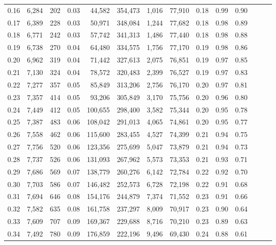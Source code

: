 \begin{tabular}{rrrrrrrrrrrrrr}
0.16 &  6,284 &    202 &  0.03 &   44,582 &  354,473 &   1,016 &  77,910 &  0.18 &  0.99 &      0.90 \\
0.17 &  6,389 &    228 &  0.03 &   50,971 &  348,084 &   1,244 &  77,682 &  0.18 &  0.98 &      0.89 \\
0.18 &  6,771 &    242 &  0.03 &   57,742 &  341,313 &   1,486 &  77,440 &  0.18 &  0.98 &      0.88 \\
0.19 &  6,738 &    270 &  0.04 &   64,480 &  334,575 &   1,756 &  77,170 &  0.19 &  0.98 &      0.86 \\
0.20 &  6,962 &    319 &  0.04 &   71,442 &  327,613 &   2,075 &  76,851 &  0.19 &  0.97 &      0.85 \\
0.21 &  7,130 &    324 &  0.04 &   78,572 &  320,483 &   2,399 &  76,527 &  0.19 &  0.97 &      0.83 \\
0.22 &  7,277 &    357 &  0.05 &   85,849 &  313,206 &   2,756 &  76,170 &  0.20 &  0.97 &      0.81 \\
0.23 &  7,357 &    414 &  0.05 &   93,206 &  305,849 &   3,170 &  75,756 &  0.20 &  0.96 &      0.80 \\
0.24 &  7,449 &    412 &  0.05 &  100,655 &  298,400 &   3,582 &  75,344 &  0.20 &  0.95 &      0.78 \\
0.25 &  7,387 &    483 &  0.06 &  108,042 &  291,013 &   4,065 &  74,861 &  0.20 &  0.95 &      0.77 \\
0.26 &  7,558 &    462 &  0.06 &  115,600 &  283,455 &   4,527 &  74,399 &  0.21 &  0.94 &      0.75 \\
0.27 &  7,756 &    520 &  0.06 &  123,356 &  275,699 &   5,047 &  73,879 &  0.21 &  0.94 &      0.73 \\
0.28 &  7,737 &    526 &  0.06 &  131,093 &  267,962 &   5,573 &  73,353 &  0.21 &  0.93 &      0.71 \\
0.29 &  7,686 &    569 &  0.07 &  138,779 &  260,276 &   6,142 &  72,784 &  0.22 &  0.92 &      0.70 \\
0.30 &  7,703 &    586 &  0.07 &  146,482 &  252,573 &   6,728 &  72,198 &  0.22 &  0.91 &      0.68 \\
0.31 &  7,694 &    646 &  0.08 &  154,176 &  244,879 &   7,374 &  71,552 &  0.23 &  0.91 &      0.66 \\
0.32 &  7,582 &    635 &  0.08 &  161,758 &  237,297 &   8,009 &  70,917 &  0.23 &  0.90 &      0.64 \\
0.33 &  7,609 &    707 &  0.09 &  169,367 &  229,688 &   8,716 &  70,210 &  0.23 &  0.89 &      0.63 \\
0.34 &  7,492 &    780 &  0.09 &  176,859 &  222,196 &   9,496 &  69,430 &  0.24 &  0.88 &      0.61 \\

\end{tabular}
